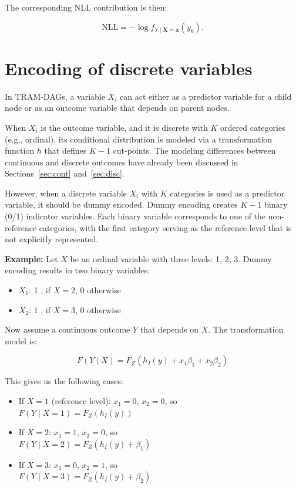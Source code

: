 The corresponding NLL contribution is then:

\begin{equation*}
\text{NLL} = - \log f_{Y \mid \mathbf{X} = \mathbf{x}}(y_k).
\end{equation*}






\section{Encoding of discrete variables} \label{sec:encoding_discrete_variables}

In TRAM-DAGs, a variable $X_i$ can act either as a predictor variable for a child node or as an outcome variable that depends on parent nodes.

When $X_i$ is the outcome variable, and it is discrete with $K$ ordered categories (e.g., ordinal), its conditional distribution is modeled via a transformation function $h$ that defines $K-1$ cut-points. The modeling differences between continuous and discrete outcomes have already been discussed in Sections~\ref{sec:cont} and~\ref{sec:disc}.

However, when a discrete variable $X_i$ with $K$ categories is used as a predictor variable, it should be dummy encoded. Dummy encoding creates $K - 1$ binary (0/1) indicator variables. Each binary variable corresponds to one of the non-reference categories, with the first category serving as the reference level that is not explicitly represented.

\vspace{1em}
\noindent
\textbf{Example:} Let $X$ be an ordinal variable with three levels: 1, 2, 3. Dummy encoding results in two binary variables:
\begin{itemize}
  \item $X_1$: 1 , if $X = 2$, 0 otherwise
  \item $X_2$: 1 , if $X = 3$, 0 otherwise
\end{itemize}

Now assume a continuous outcome $Y$ that depends on $X$. The transformation model is:

\[
F(Y \mid X) = F_Z(h_I(y) + x_1 \beta_1 + x_2 \beta_2)
\]

This gives us the following cases:
\begin{itemize}
  \item If $X = 1$ (reference level): $x_1 = 0$, $x_2 = 0$, so \\
  $F(Y \mid X=1) = F_Z(h_I(y))$
  \item If $X = 2$: $x_1 = 1$, $x_2 = 0$, so \\
  $F(Y \mid X=2) = F_Z(h_I(y) + \beta_1)$
  \item If $X = 3$: $x_1 = 0$, $x_2 = 1$, so \\
  $F(Y \mid X=3) = F_Z(h_I(y) + \beta_2)$
\end{itemize}

